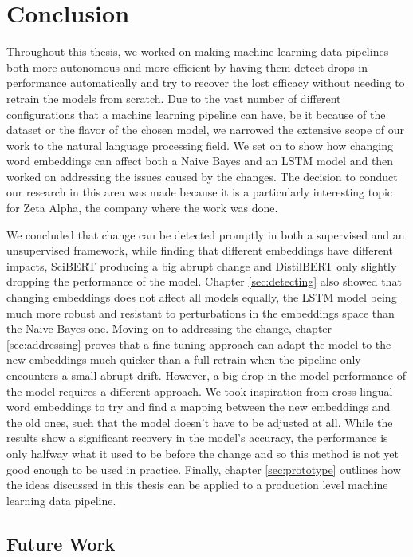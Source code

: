 \documentclass[12pt]{extreport}
\begin{document}
\chapter{Conclusion} \label{sec:conclusion}

Throughout this thesis, we worked on making machine learning data pipelines both more autonomous and more efficient by having them detect drops in performance automatically and try to recover the lost efficacy without needing to retrain the models from scratch. Due to the vast number of different configurations that a machine learning pipeline can have, be it because of the dataset or the flavor of the chosen model, we narrowed the extensive scope of our work to the natural language processing field. We set on to show how changing word embeddings can affect both a Naive Bayes and an LSTM model and then worked on addressing the issues caused by the changes. The decision to conduct our research in this area was made because it is a particularly interesting topic  for Zeta Alpha, the company where the work was done.

We concluded that change can be detected promptly in both a supervised and an unsupervised framework, while finding that different embeddings have different impacts, SciBERT producing a big abrupt change and DistilBERT only slightly dropping the performance of the model. Chapter \ref{sec:detecting} also showed that changing embeddings does not affect all models equally, the LSTM model being much more robust and resistant to perturbations in the embeddings space than the Naive Bayes one. Moving on to addressing the change, chapter \ref{sec:addressing} proves that a fine-tuning approach can adapt the model to the new embeddings much quicker than a full retrain when the pipeline only encounters a small abrupt drift. However, a big drop in the model performance of the model requires a different approach. We took inspiration from cross-lingual word embeddings to try and find a mapping between the new embeddings and the old ones, such that the model doesn't have to be adjusted at all. While the results show a significant recovery in the model's accuracy, the performance is only halfway what it used to be before the change and so this method is not yet good enough to be used in practice. Finally, chapter \ref{sec:prototype} outlines how the ideas discussed in this thesis can be applied to a production level machine learning data pipeline.

\section{Future Work}
\end{document}
